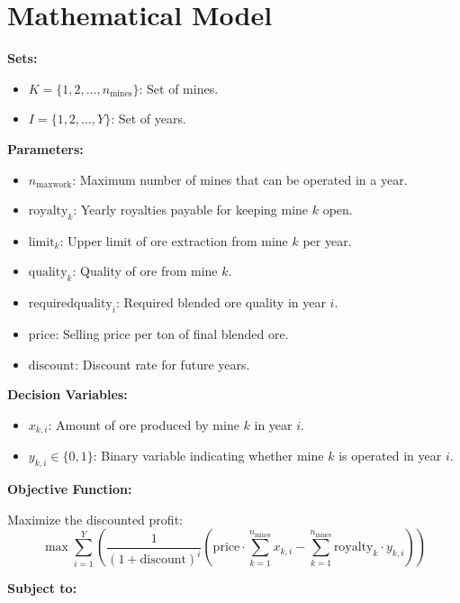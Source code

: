 \documentclass{article}
\begin{document}
\section*{Mathematical Model}

\textbf{Sets:}

\begin{itemize}
    \item $K = \{1, 2, \ldots, n_{\text{mines}}\}$: Set of mines.
    \item $I = \{1, 2, \ldots, Y\}$: Set of years.
\end{itemize}

\textbf{Parameters:}

\begin{itemize}
    \item $n_{\text{maxwork}}$: Maximum number of mines that can be operated in a year.
    \item $\text{royalty}_{k}$: Yearly royalties payable for keeping mine $k$ open.
    \item $\text{limit}_{k}$: Upper limit of ore extraction from mine $k$ per year.
    \item $\text{quality}_{k}$: Quality of ore from mine $k$.
    \item $\text{requiredquality}_{i}$: Required blended ore quality in year $i$.
    \item $\text{price}$: Selling price per ton of final blended ore.
    \item $\text{discount}$: Discount rate for future years.
\end{itemize}

\textbf{Decision Variables:}

\begin{itemize}
    \item $x_{k,i}$: Amount of ore produced by mine $k$ in year $i$.
    \item $y_{k,i} \in \{0,1\}$: Binary variable indicating whether mine $k$ is operated in year $i$.
\end{itemize}

\textbf{Objective Function:}

Maximize the discounted profit:
\[
\max \sum_{i=1}^{Y} \left( \frac{1}{(1+\text{discount})^{i}} \left( \text{price} \cdot \sum_{k=1}^{n_{\text{mines}}} x_{k,i} - \sum_{k=1}^{n_{\text{mines}}} \text{royalty}_{k} \cdot y_{k,i} \right) \right)
\]

\textbf{Subject to:}
\end{document}
